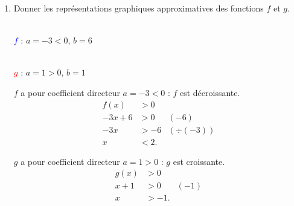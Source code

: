 \documentclass[10pt,a4paper]{article}
\begin{document}
\begin{enumerate}
\item Donner les représentations graphiques approximatives des fonctions \(f\) et \(g\).

\begin{center}
\begin{minipage}{2.6cm}
\centering
{}\\[2pt]
{\scriptsize \textcolor{blue}{\(f\)} : \(a=-3<0\), \(b=6\)}
\end{minipage}
\hspace{0.3cm}
\begin{minipage}{2.6cm}
\centering
{}\\[2pt]
{\scriptsize \textcolor{red}{\(g\)} : \(a=1>0\), \(b=1\)}
\end{minipage}
\end{center}

\begin{center}
\begin{minipage}{0.48\linewidth}
\(f\) a pour coefficient directeur \(a=-3<0\) : \(f\) est décroissante.
\[
\begin{aligned}
f(x)&>0\\
-3x+6&>0 &\scriptstyle(-6)\\
-3x&>-6 &\scriptstyle(\div(-3))\\
x&<2.
\end{aligned}
\]
\end{minipage}
\hfill
\begin{minipage}{0.48\linewidth}
\(g\) a pour coefficient directeur \(a=1>0\) : \(g\) est croissante.
\[
\begin{aligned}
g(x)&>0\\
x+1&>0 &\scriptstyle(-1)\\
x&>-1.
\end{aligned}
\]
\end{minipage}
\end{center}


\end{enumerate}
\end{document}
